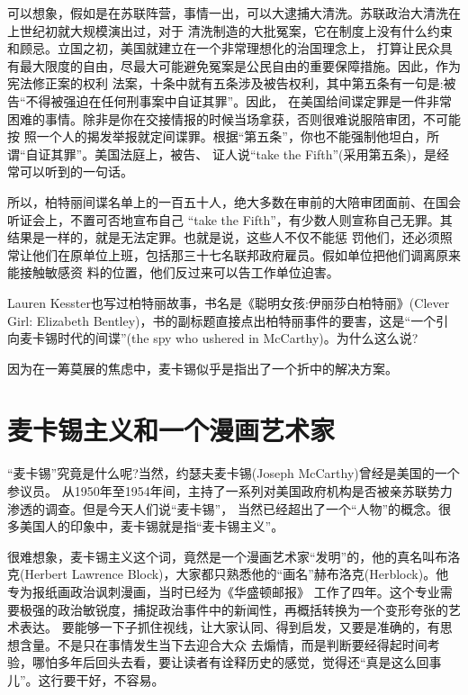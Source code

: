 \documentclass[10pt]{article}
\begin{document}
{可以想象，假如是在苏联阵营，事情一出，可以大逮捕大清洗。苏联政治大清洗在上世纪初就大规模演出过，对于
清洗制造的大批冤案，它在制度上没有什么约束和顾忌。立国之初，美国就建立在一个非常理想化的治国理念上，
打算让民众具有最大限度的自由，尽最大可能避免冤案是公民自由的重要保障措施。因此，作为宪法修正案的权利
法案，十条中就有五条涉及被告权利，其中第五条有一句是:被告``不得被强迫在任何刑事案中自证其罪''。因此，
在美国给间谍定罪是一件非常困难的事情。除非是你在交接情报的时候当场拿获，否则很难说服陪审团，不可能按
照一个人的揭发举报就定间谍罪。根据``第五条''，你也不能强制他坦白，所谓``自证其罪''。美国法庭上，被告、
证人说``take the Fifth''(采用第五条)，是经常可以听到的一句话。

所以，柏特丽间谍名单上的一百五十人，绝大多数在审前的大陪审团面前、在国会听证会上，不置可否地宣布自己
``take the Fifth''，有少数人则宣称自己无罪。其结果是一样的，就是无法定罪。也就是说，这些人不仅不能惩
罚他们，还必须照常让他们在原单位上班，包括那三十七名联邦政府雇员。假如单位把他们调离原来能接触敏感资
料的位置，他们反过来可以告工作单位迫害。

Lauren Kesster也写过柏特丽故事，书名是《聪明女孩:伊丽莎白\textperiodcentered 柏特丽》(Clever Girl:
Elizabeth Bentley)，书的副标题直接点出柏特丽事件的要害，这是``一个引向麦卡锡时代的间谍''(the spy who
ushered in McCarthy)。为什么这么说?

因为在一筹莫展的焦虑中，麦卡锡似乎是指出了一个折中的解决方案。

\pagebreak
\section{麦卡锡主义和一个漫画艺术家}

``麦卡锡''究竟是什么呢?当然，约瑟夫\textperiodcentered 麦卡锡(Joseph McCarthy)曾经是美国的一个参议员。
从1950年至1954年间，主持了一系列对美国政府机构是否被亲苏联势力渗透的调查。但是今天人们说``麦卡锡''，
当然已经超出了一个``人物''的概念。很多美国人的印象中，麦卡锡就是指``麦卡锡主义''。

很难想象，麦卡锡主义这个词，竟然是一个漫画艺术家``发明''的，他的真名叫布洛克(Herbert Lawrence
Block)，大家都只熟悉他的``画名''赫布洛克(Herblock)。他专为报纸画政治讽刺漫画，当时已经为《华盛顿邮报》
工作了四年。这个专业需要极强的政治敏锐度，捕捉政治事件中的新闻性，再概括转换为一个变形夸张的艺术表达。
要能够一下子抓住视线，让大家认同、得到启发，又要是准确的，有思想含量。不是只在事情发生当下去迎合大众
去煽情，而是判断要经得起时间考验，哪怕多年后回头去看，要让读者有诠释历史的感觉，觉得还``真是这么回事
儿''。这行要干好，不容易。

}
\end{document}
